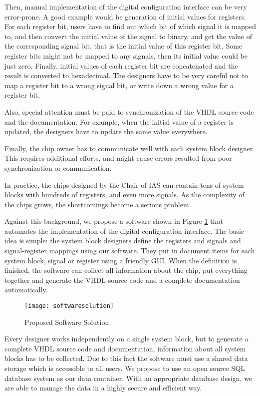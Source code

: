 Then, manual implementation of the digital configuration interface can be very error-prone. A good example would be generation of initial values for registers. For each register bit, users have to find out which bit of which signal it is mapped to, and then convert the initial value of the signal to binary, and get the value of the corresponding signal bit, that is the initial value of this register bit. Some register bits might not be mapped to any signals, then its initial value could be just zero. Finally, initial values of each register bit are concatenated and the result is converted to hexadecimal. The designers have to be very careful not to map a register bit to a wrong signal bit, or write down a wrong value for a register bit.

Also, special attention must be paid to synchronization of the VHDL source code and the documentation. For example, when the initial value of a register is updated, the designers have to update the same value everywhere.

Finally, the chip owner has to communicate well with each system block designer. This requires additional efforts, and might cause errors resulted from poor synchronization or communication.

In practice, the chips designed by the Chair of IAS can contain tens of system blocks with hundreds of registers, and even more signals. As the complexity of the chips grows, the shortcomings become a serious problem. 

Against this background, we propose a software shown in Figure \ref{fig:Proposed Software Solution} that automates the implementation of the digital configuration interface. The basic idea is simple: the system block designers define the registers and signals and signal-register mappings using our software. They put in document items for each system block, signal or register using a friendly GUI. When the definition is finished, the software can collect all information about the chip, put everything together and generate the VHDL source code and a complete documentation automatically.

\begin{figure}[htb]
\centering
\texttt{[image: softwaresolution]}
\caption{Proposed Software Solution\label{fig:Proposed Software Solution}}
\end{figure}

Every designer works independently on a single system block, but to generate a complete VHDL source code and documentation, information about all system blocks has to be collected. Due to this fact the software must use a shared data storage which is accessible to all users. We propose to use an open source SQL database system as our data container. With an appropriate database design, we are able to manage the data in a highly secure and efficient way.

